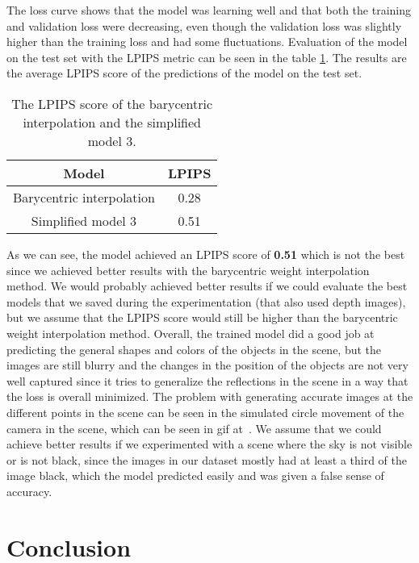 The loss curve shows that the model was learning well and that both the training and validation loss were decreasing, even though the validation loss was slightly higher than the training loss and had some fluctuations.
Evaluation of the model on the test set with the LPIPS metric can be seen in the table \ref{table:lpips_bilinear}. 
The results are the average LPIPS score of the predictions of the model on the test set.

\begin{table}[htb]
    \centering
    \begin{tabular}{|c|c|} \hline
    Model & LPIPS \\ \hline
    Barycentric interpolation & 0.28 \\ \hline
    Simplified model 3 & 0.51 \\ \hline
    \end{tabular}
    \caption{The LPIPS score of the barycentric interpolation and the simplified model 3.}
    \label{table:lpips_bilinear}
\end{table}

As we can see, the model achieved an LPIPS score of \textbf{0.51} which is not the best since we achieved better results with the barycentric weight interpolation method.
We would probably achieved better results if we could evaluate the best models that we saved during the experimentation (that also used depth images), but we assume that the LPIPS score would still be higher than the barycentric weight interpolation method.
Overall, the trained model did a good job at predicting the general shapes and colors of the objects in the scene, but the images are still blurry and the changes in the position of the objects are not very well captured since it tries to generalize the reflections in the scene in a way that the loss is overall minimized. The problem with generating accurate images at the different points in the scene can be seen in the simulated circle movement of the camera in the scene, which can be seen in gif at~\cite{gif}.
We assume that we could achieve better results if we experimented with a scene where the sky is not visible or is not black, since the images in our dataset mostly had at least a third of the image black, which the model predicted easily and was given a false sense of accuracy. 

\section{Conclusion}

